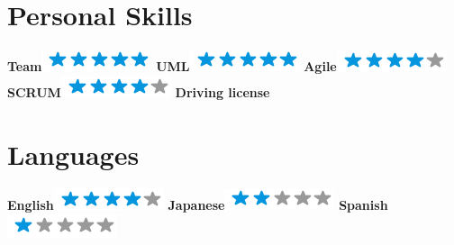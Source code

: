 \documentclass[]{friggeri-cv}
\begin{document}
\begin{aside}
  \section{Personal Skills}
    \textbf{Team}\includegraphics[scale=0.40]{img/5stars.png}
    \textbf{UML}\includegraphics[scale=0.4]{img/5stars.png}
    \textbf{Agile}\includegraphics[scale=0.4]{img/4stars.png}
     \textbf{SCRUM}\includegraphics[scale=0.4]{img/4stars.png}
    \textbf{Driving license}
    ~
    \section{Languages}
    \textbf{English}\includegraphics[scale=0.4]{img/4stars.png}
    \textbf{Japanese}\includegraphics[scale=0.4]{img/2stars.png}
    \textbf{Spanish}\includegraphics[scale=0.4]{img/1stars.png}
  ~ 
\end{aside}
\end{document}
